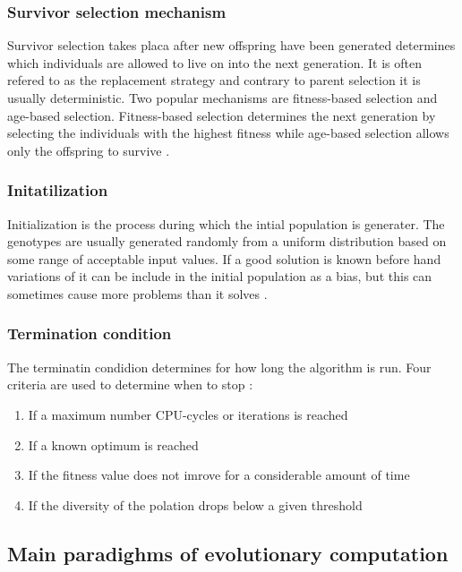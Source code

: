 \subsubsection{Survivor selection mechanism}

Survivor selection takes placa after new offspring have been generated determines which individuals are allowed to live on into the next generation. It is often refered to as the replacement strategy and contrary to parent selection it is usually deterministic. Two popular mechanisms are fitness-based selection and age-based selection. Fitness-based selection determines the next generation by selecting the individuals with the highest fitness while age-based selection allows only the offspring to survive \cite{Eiben2015_whatevolutionary}.

\subsubsection{Initatilization}

Initialization is the process during which the intial population is generater. The genotypes are usually generated randomly from a uniform distribution based on some range of acceptable input values. If a good solution is known before hand variations of it can be include in the initial population as a bias, but this can sometimes cause more problems than it solves \cite{Eiben20021}.

\subsubsection{Termination condition}

The terminatin condidion determines for how long the algorithm is run. Four criteria are used to determine when to stop \cite{Eiben2015_whatevolutionary}:

\begin{enumerate}
  \item If a maximum number CPU-cycles or iterations is reached
  \item If a known optimum is reached
  \item If the fitness value does not imrove for a considerable amount of time
  \item If the diversity of the polation drops below a given threshold
\end{enumerate}

\subsection{Main paradighms of evolutionary computation}

